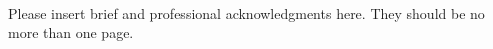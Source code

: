 


\begin{center}

\end{center}
\begin{center}

{\bf\fontsize{14pt}{14.5pt}\selectfont {Acknowledgements}}\\\vspace{1cm}
\end{center}






Please insert brief and professional acknowledgments here. They should be no more than one page.

